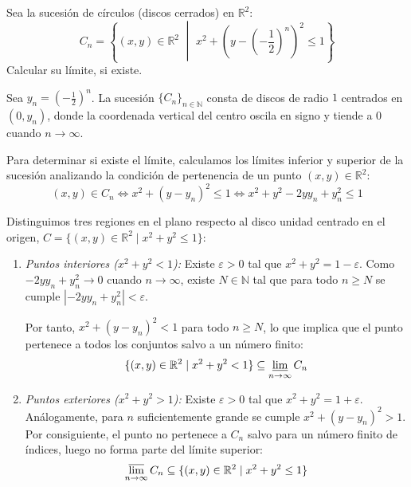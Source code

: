 \begin{problema}
Sea la sucesión de círculos (discos cerrados) en $\mathbb{R}^2$:
\[
    C_n = \left\{ (x,y) \in \mathbb{R}^2 \,\,\middle|\,\, x^2 + \left(y - \left(-\frac{1}{2}\right)^n\right)^2 \le 1 \right\}
\]
Calcular su límite, si existe.

\tcblower

Sea $y_n = \left(-\frac{1}{2}\right)^n$. La sucesión $\{C_n\}_{n \in \mathbb{N}}$ consta de discos de radio $1$ centrados en $(0, y_n)$, donde la coordenada vertical del centro oscila en signo y tiende a $0$ cuando $n \to \infty$.

Para determinar si existe el límite, calculamos los límites inferior y superior de la sucesión analizando la condición de pertenencia de un punto $(x,y) \in \mathbb{R}^2$:
\[
    (x,y) \in C_n \iff x^2 + (y - y_n)^2 \le 1 \iff x^2 + y^2 - 2y y_n + y_n^2 \le 1
\]

Distinguimos tres regiones en el plano respecto al disco unidad centrado en el origen, $C = \{(x,y) \in \mathbb{R}^2 \mid x^2 + y^2 \le 1\}$:

\begin{enumerate}[label=\arabic*.]
    \item \textit{Puntos interiores ($x^2 + y^2 < 1$):}
    Existe $\varepsilon > 0$ tal que $x^2 + y^2 = 1 - \varepsilon$. Como $-2y y_n + y_n^2 \to 0$ cuando $n \to \infty$, existe $N \in \mathbb{N}$ tal que para todo $n \ge N$ se cumple $|-2y y_n + y_n^2| < \varepsilon$. 
    
    Por tanto, $x^2 + (y - y_n)^2 < 1$ para todo $n \ge N$, lo que implica que el punto pertenece a todos los conjuntos salvo a un número finito:
    \[
        \{(x,y) \in \mathbb{R}^2 \mid x^2 + y^2 < 1\} \subseteq \varliminf_{n \to \infty} C_n
    \]

    \item \textit{Puntos exteriores ($x^2 + y^2 > 1$):}
    Existe $\varepsilon > 0$ tal que $x^2 + y^2 = 1 + \varepsilon$. Análogamente, para $n$ suficientemente grande se cumple $x^2 + (y - y_n)^2 > 1$. Por consiguiente, el punto no pertenece a $C_n$ salvo para un número finito de índices, luego no forma parte del límite superior:
    \[
        \varlimsup_{n \to \infty} C_n \subseteq \{(x,y) \in \mathbb{R}^2 \mid x^2 + y^2 \le 1\}
    \]


\end{enumerate}
\end{problema}
